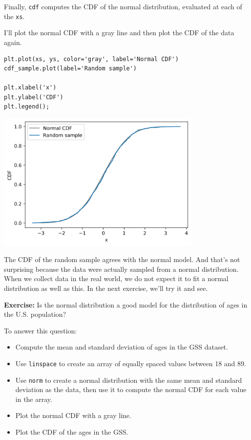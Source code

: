 Finally, \passthrough{\lstinline!cdf!} computes the CDF of the normal
distribution, evaluated at each of the \passthrough{\lstinline!xs!}.

I'll plot the normal CDF with a gray line and then plot the CDF of the
data again.

\begin{lstlisting}[]
plt.plot(xs, ys, color='gray', label='Normal CDF')
cdf_sample.plot(label='Random sample')

plt.xlabel('x')
plt.ylabel('CDF')
plt.legend();
\end{lstlisting}

\begin{center}
\includegraphics[width=4in]{chapters/08_distributions_files/08_distributions_113_0.png}
\end{center}

The CDF of the random sample agrees with the normal model. And that's
not surprising because the data were actually sampled from a normal
distribution. When we collect data in the real world, we do not expect
it to fit a normal distribution as well as this. In the next exercise,
we'll try it and see.

\textbf{Exercise:} Is the normal distribution a good model for the
distribution of ages in the U.S. population?

To answer this question:

\begin{itemize}
\item
  Compute the mean and standard deviation of ages in the GSS dataset.
\item
  Use \passthrough{\lstinline!linspace!} to create an array of equally
  spaced values between 18 and 89.
\item
  Use \passthrough{\lstinline!norm!} to create a normal distribution
  with the same mean and standard deviation as the data, then use it to
  compute the normal CDF for each value in the array.
\item
  Plot the normal CDF with a gray line.
\item
  Plot the CDF of the ages in the GSS.
\end{itemize}

